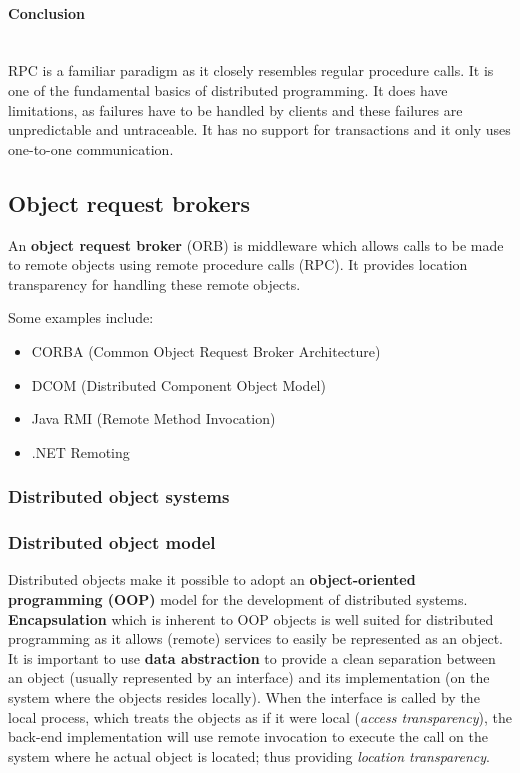 \documentclass[a4paper]{article}
\newcommand{\subsubsubsection}[1]{\paragraph{#1}\mbox{}\\}
\begin{document}
\subsubsubsection{Conclusion}

RPC is a familiar paradigm as it closely resembles regular procedure calls. It is one of the fundamental basics of distributed programming. It does have limitations, as failures have to be handled by clients and these failures are unpredictable and untraceable. It has no support for transactions and it only uses one-to-one communication.

\subsection{Object request brokers}

An \textbf{object request broker} (ORB) is middleware which allows calls to be made to remote objects using remote procedure calls (RPC). It provides location transparency for handling these remote objects.

Some examples include:
\begin{itemize}
\item CORBA (Common Object Request Broker Architecture)
\item DCOM (Distributed Component Object Model)
\item Java RMI (Remote Method Invocation)
\item .NET Remoting
\end{itemize}

\subsubsection{Distributed object systems}

\subsubsection{Distributed object model}

Distributed objects make it possible to adopt an \textbf{object-oriented programming (OOP)} model for the development of distributed systems. \textbf{Encapsulation} which is inherent to OOP objects is well suited for distributed programming as it allows (remote) services to easily be represented as an object. It is important to use \textbf{data abstraction} to provide a clean separation between an object (usually represented by an interface) and its implementation (on the system where the objects resides locally). When the interface is called by the local process, which treats the objects as if it were local (\textit{access transparency}), the back-end implementation will use remote invocation to execute the call on the system where he actual object is located; thus providing \textit{location transparency}.
\end{document}
